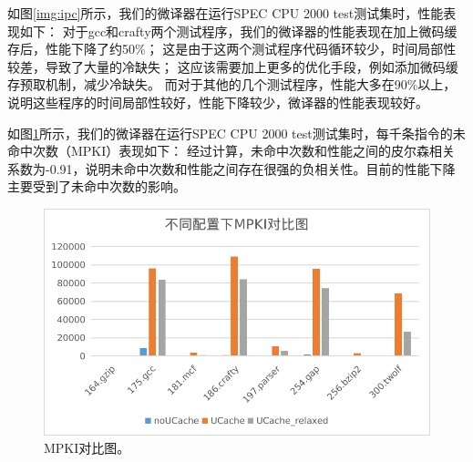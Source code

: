 如图\ref{img:ipc}所示，我们的微译器在运行SPEC CPU 2000 test测试集时，性能表现如下：
对于gcc和crafty两个测试程序，我们的微译器的性能表现在加上微码缓存后，性能下降了约50\%；
这是由于这两个测试程序代码循环较少，时间局部性较差，导致了大量的冷缺失；
这应该需要加上更多的优化手段，例如添加微码缓存预取机制，减少冷缺失。
而对于其他的几个测试程序，性能大多在90\%以上，说明这些程序的时间局部性较好，性能下降较少，微译器的性能表现较好。

如图\ref{img:MPKI}所示，我们的微译器在运行SPEC CPU 2000 test测试集时，每千条指令的未命中次数（MPKI）表现如下：
经过计算，未命中次数和性能之间的皮尔森相关系数为-0.91，说明未命中次数和性能之间存在很强的负相关性。目前的性能下降主要受到了未命中次数的影响。

\begin{figure}[h]
  \centering
  \includegraphics[width=0.8\linewidth]{./plot/MPKI.png}
  \caption{MPKI对比图。}
  \label{img:MPKI}
\end{figure}
